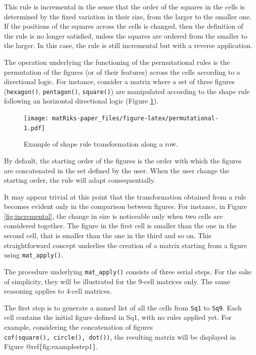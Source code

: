 This rule is incremental in the sense that the order of the squares in the cells is determined by the fixed variation in their size, from the larger to the smaller one.
If the positions of the squares across the cells is changed, then the definition of the rule is no longer satisfied, unless the squares are ordered from the smaller to the larger.
In this case, the rule is still incremental but with a reverse application.

The operation underlying the functioning of the permutational rules is the permutation of the figures (or of their features) across the cells according to a directional logic.
For instance, consider a matrix where a set of three figures (\texttt{hexagon()}, \texttt{pentagon()}, \texttt{square()}) are manipulated according to the shape rule following an horizontal directional logic (Figure \ref{fig:permutational}).

\begin{figure}
\centering
\texttt{[image: matRiks-paper\_files/figure-latex/permutational-1.pdf]}
\caption{\label{fig:permutational}Example of shape rule transformation along a row.}
\end{figure}

By default, the starting order of the figures is the order with which the figures are concatenated in the set defined by the user.
When the user change the starting order, the rule will adapt consequentially.

It may appear trivial at this point that the transformation obtained from a rule becomes evident only in the comparison between figures.
For instance, in Figure \ref{fig:incremental}, the change in size is noticeable only when two cells are considered together.
The figure in the first cell is smaller than the one in the second cell, that is smaller than the one in the third and so on.
This straightforward concept underlies the creation of a matrix starting from a figure using \texttt{mat\_apply()}.

The procedure underlying \texttt{mat\_apply()} consists of three serial steps.
For the sake of simplicity, they will be illustrated for the 9-cell matrices only.
The same reasoning applies to 4-cell matrices.

The first step is to generate a named list of all the cells from \texttt{Sq1} to \texttt{Sq9}.
Each cell contains the initial figure defined in Sq1, with no rules applied yet.
For example, considering the concatenation of figures \texttt{cof(square(),\ circle(),\ dot())}, the resulting matrix will be displayed in Figure @ref\{fig:examplestep1\}.

